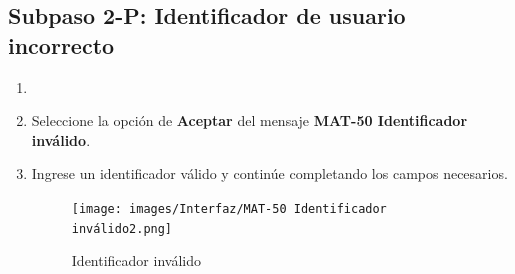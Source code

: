 \subsection{Subpaso 2-P: Identificador de usuario incorrecto}
\begin{enumerate}
	\item \item Seleccione la opción de \textbf{Aceptar} del mensaje
\textbf{MAT-50 Identificador inválido}.
	\item Ingrese un identificador válido y continúe completando los campos necesarios.
	\begin{figure}[hbtp]
	\texttt{[image: images/Interfaz/MAT-50 Identificador inválido2.png]}
	\caption{Identificador inválido}
	\end{figure}
\end{enumerate}
